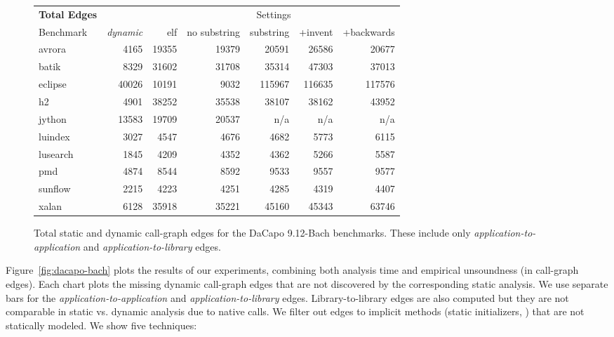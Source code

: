 \begin{figure}[h]
  \renewcommand{\tabcolsep}{1.5mm}
  \centering
  \begin{tabular}{lr@{ \quad }rrrrr}
    \toprule
    \textbf{Total Edges} & & \multicolumn{5}{c}{Settings} \\
    \cmidrule(l){3-7}
    Benchmark & \emph{dynamic} & elf & no substring 
              & substring & +invent & +backwards
    \\
    \midrule
    avrora & 4165 & 19355 & 19379 & 20591 & 26586 & 20677 \\
    batik & 8329 & 31602 & 31708 & 35314 & 47303 & 37013 \\
    eclipse & 40026 & 10191 & 9032 & 115967 & 116635 & 117576 \\
    h2 & 4901 & 38252 & 35538 & 38107 & 38162 & 43952 \\
    jython & 13583 & 19709 & 20537 & n/a & n/a & n/a \\
    luindex & 3027 & 4547 & 4676 & 4682 & 5773 & 6115 \\
    lusearch & 1845 & 4209 & 4352 & 4362 & 5266 & 5587 \\
    pmd & 4874 & 8544 & 8592 & 9533 & 9557 & 9577 \\
    sunflow & 2215 & 4223 & 4251 & 4285 & 4319 & 4407 \\
    xalan & 6128 & 35918 & 35221 & 45160 & 45343 & 63746 \\
    \bottomrule
  \end{tabular}
  \caption{Total static and dynamic call-graph edges for the DaCapo 9.12-Bach
    benchmarks. These include only \emph{application-to-application}
    and \emph{application-to-library} edges.}
  \label{fig:total_static}
\end{figure}


Figure~\ref{fig:dacapo-bach} plots the results of our experiments,
combining both analysis time and empirical unsoundness (in call-graph
edges). 
Each chart plots the
missing dynamic call-graph edges that are not discovered by the
corresponding static analysis. We use separate bars for the
\emph{application-to-application} and \emph{application-to-library}
edges. Library-to-library edges are also computed but they are not
comparable in static vs. dynamic analysis due to native calls.  We
filter out edges to implicit methods (static initializers,
) that are not statically modeled.
We show five techniques:

